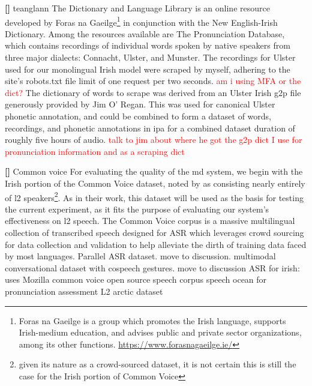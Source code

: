 \documentclass[thesis]{cluu}
\newcounter{paranum}
\newcommand{\numberedparagraph}{\par\refstepcounter{paranum}\textbf{[\theparanum] }}
\newcommand{\todo}[1]{\textcolor{red}{#1}}
\begin{document}
\numberedparagraph teanglann
The Dictionary and Language Library is an online resource developed by Foras na Gaeilge\footnote{Foras na Gaeilge is a group which promotes the Irish language, supports Irish-medium education, and advises public and private sector organizations, among its other functions. \url{https://www.forasnagaeilge.ie/}} in conjunction with the New English-Irish Dictionary. Among the resources available are The Pronunciation Database, which contains recordings of individual words spoken by native speakers from three major dialects: Connacht, Ulster, and Munster. The recordings for Ulster used for our monolingual Irish model were scraped by myself, adhering to the site's robots.txt file limit of one request per two seconds. \todo{am i using MFA or the dict?} The dictionary of words to scrape was derived from an Ulster Irish \gls{g2p} file generously provided by Jim O' Regan. This was used for canonical Ulster phonetic annotation, and could be combined to form a dataset of words, recordings, and phonetic annotations in \gls{ipa} for a combined dataset duration of roughly five hours of audio.
\todo{talk to jim about where he got the g2p dict I use for pronunciation information and as a scraping dict}

\numberedparagraph Common voice
For evaluating the quality of the \gls{md} system, we begin with the Irish portion of the Common Voice dataset\textcite{ardila2019common}, noted by \textcite{lonerganAutomaticSpeechRecognition} as consisting nearly entirely of \gls{l2} speakers\footnote{given its nature as a crowd-sourced dataset, it is not certain this is still the case for the Irish portion of Common Voice}. As in their work, this dataset will be used as the basis for testing the current experiment, as it fits the purpose of evaluating our system's effectiveness on \gls{l2} speech. The Common Voice corpus is a massive multilingual collection of transcribed speech designed for ASR which leverages crowd sourcing for data collection and validation to help alleviate the dirth of training data faced by most languages. 
\textcite{conneauFLEURSFewshotLearning2022} Parallel ASR dataset. move to discussion.
\textcite{deichlerMMConvMultimodalConversational2024} multimodal conversational dataset with cospeech gestures. move to discussion
\textcite{qianAutomaticSpeechRecognition2022} ASR for irish: uses Mozilla common voice
\textcite{zhangSpeechocean762OpenSourceNonnative2021} open source speech corpus speech ocean for pronunciation assessment
\textcite{zhaoL2ARCTICNonnativeEnglish2018} L2 arctic dataset
\end{document}
